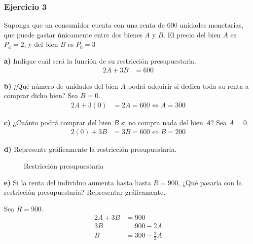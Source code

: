 \documentclass{templateNote}
\begin{document}
\newpage
\subsubsection{Ejercicio 3}
Suponga que un consumidor cuenta con una renta de 600 unidades monetarias, que puede
gastar únicamente entre dos bienes $A$ y $B$. El precio del bien $A$ es $P_a = 2$, y del bien $B$ es
$P_b = 3$

\textbf{a)} Indique cuál será la función de su restricción presupuestaria.
\begin{align*}
    2A + 3B &= 600
\end{align*}

\textbf{b)} ¿Qué número de unidades del bien $A$ podrá adquirir si dedica toda su renta a
comprar dicho bien?
Sea $B = 0$.
\begin{align*}
    2A + 3(0) &= 2A = 600 \Leftrightarrow A = 300
\end{align*}

\textbf{c)} ¿Cuánto podrá comprar del bien $B$ si no compra nada del bien $A$?
Sea $A = 0$.
\begin{align*}
    2(0) + 3B &= 3B = 600 \Leftrightarrow B = 200
\end{align*}

\textbf{d)} Represente gráficamente la restricción presupuestaria.
\begin{figure}[H]
    \centering
    \caption{Restricción presupuestaria}
\end{figure}

\newpage
\textbf{e)}  Si la renta del individuo aumenta hasta hasta $R = 900$, ¿Qué pasaría con la
restricción presupuestaria? Representar gráficamente.

Sea $R = 900$.
\begin{align*}
    2A + 3B &= 900 \\
    3B &= 900 - 2A \\
    B &= 300 - \frac{2}{3}A
\end{align*}
\end{document}
